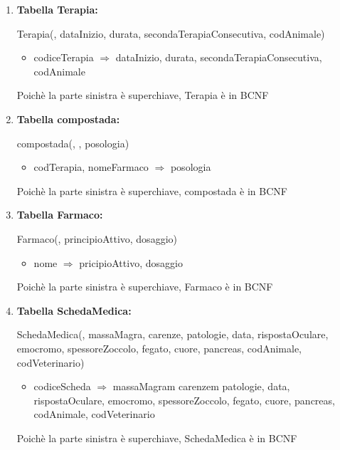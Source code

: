 \documentclass[12pt,a4paper]{article}
\begin{document}
\begin{enumerate}
\item[] \textbf{Tabella Terapia:}

Terapia(\underline{}, dataInizio, durata, secondaTerapiaConsecutiva,  codAnimale)
\begin{itemize}
\vspace{-5pt}
\item codiceTerapia $\Rightarrow$ dataInizio, durata, secondaTerapiaConsecutiva, codAnimale
\vspace{-5pt}
\end{itemize}
Poichè la parte sinistra è superchiave, Terapia è in BCNF
\vspace{10pt}



\item[] \textbf{Tabella compostada:}

compostada(\underline{}, \underline{}, posologia)
\begin{itemize}
\vspace{-5pt}
\item codTerapia, nomeFarmaco $\Rightarrow$ posologia
\vspace{-5pt}
\end{itemize}
Poichè la parte sinistra è superchiave, compostada è in BCNF
\vspace{10pt}



\item[] \textbf{Tabella Farmaco:}

Farmaco(\underline{}, principioAttivo, dosaggio)
\begin{itemize}
\vspace{-5pt}
\item nome $\Rightarrow$ pricipioAttivo, dosaggio
\vspace{-5pt}
\end{itemize}
Poichè la parte sinistra è superchiave, Farmaco è in BCNF
\vspace{10pt}



\item[] \textbf{Tabella SchedaMedica:}

SchedaMedica(\underline{}, massaMagra, carenze, patologie, data, rispostaOculare, emocromo, spessoreZoccolo, fegato, cuore, pancreas, codAnimale,  codVeterinario)
\begin{itemize}
\vspace{-5pt}
\item codiceScheda $\Rightarrow$ massaMagram carenzem patologie, data, rispostaOculare, emocromo, spessoreZoccolo, fegato, cuore, pancreas, codAnimale, codVeterinario
\vspace{-5pt}
\end{itemize}
Poichè la parte sinistra è superchiave, SchedaMedica è in BCNF
\vspace{10pt}




\end{enumerate}
\end{document}
